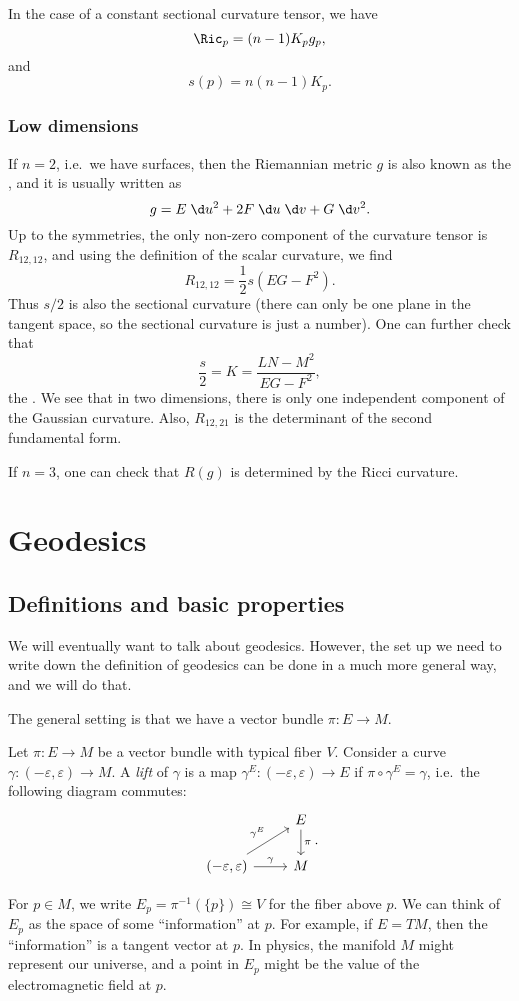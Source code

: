 \documentclass[a4paper]{article}
\begin{document}
In the case of a constant sectional curvature tensor, we have
\[
  \Ric_p = (n - 1) K_p g_p,
\]
and
\[
  s(p) = n(n - 1) K_p.
\]

\subsubsection*{Low dimensions}
If $n = 2$, i.e.\ we have surfaces, then the Riemannian metric $g$ is also known as the , and it is usually written as
\[
  g = E\;\d u^2 + 2 F \;\d u\;\d v + G \;\d v^2.
\]
Up to the symmetries, the only non-zero component of the curvature tensor is $R_{12, 12}$, and using the definition of the scalar curvature, we find
\[
  R_{12,12} = \frac{1}{2} s (EG - F^2).
\]
Thus $s/2$ is also the sectional curvature (there can only be one plane in the tangent space, so the sectional curvature is just a number). One can further check that
\[
  \frac{s}{2} = K = \frac{LN - M^2}{EG - F^2},
\]
the . We see that in two dimensions, there is only one independent component of the Gaussian curvature. Also, $R_{12, 21}$ is the determinant of the second fundamental form.

If $n = 3$, one can check that $R(g)$ is determined by the Ricci curvature.

\section{Geodesics}
\subsection{Definitions and basic properties}
We will eventually want to talk about geodesics. However, the set up we need to write down the definition of geodesics can be done in a much more general way, and we will do that.

The general setting is that we have a vector bundle $\pi: E \to M$.
\begin{defi}[Lift]
  Let $\pi: E \to M$ be a vector bundle with typical fiber $V$. Consider a curve $\gamma: (-\varepsilon, \varepsilon) \to M$. A \emph{lift} of $\gamma$ is a map $\gamma^E: (-\varepsilon, \varepsilon) \to E$ if $\pi \circ \gamma^E = \gamma$, i.e.\ the following diagram commutes:
  \[
    \begin{tikzcd}
      & E \ar[d, "\pi"]\\
      (-\varepsilon, \varepsilon) \ar[r, "\gamma"] \ar[ur, "\gamma^E"] & M
    \end{tikzcd}.
  \]
\end{defi}
For $p \in M$, we write $E_p = \pi^{-1}(\{p\}) \cong V$ for the fiber above $p$. We can think of $E_p$ as the space of some ``information'' at $p$. For example, if $E = TM$, then the ``information'' is a tangent vector at $p$. In physics, the manifold $M$ might represent our universe, and a point in $E_p$ might be the value of the electromagnetic field at $p$.
\end{document}
